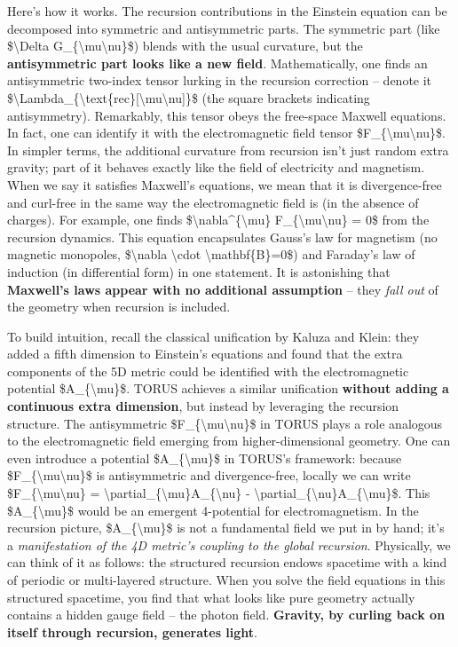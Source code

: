 Here's how it works. The recursion contributions in the Einstein
equation can be decomposed into symmetric and antisymmetric parts. The
symmetric part (like \$\textbackslash{}Delta
G\_\{\textbackslash{}mu\textbackslash{}nu\}\$) blends with the usual
curvature, but the \textbf{antisymmetric part looks like a new field}.
Mathematically, one finds an antisymmetric two-index tensor lurking in
the recursion correction -- denote it
\$\textbackslash{}Lambda\_\{\textbackslash{}text\{rec\}{[}\textbackslash{}mu\textbackslash{}nu{]}\}\$
(the square brackets indicating antisymmetry). Remarkably, this tensor
obeys the free-space Maxwell equations. In fact, one can identify it
with the electromagnetic field tensor
\$F\_\{\textbackslash{}mu\textbackslash{}nu\}\$​. In simpler terms, the
additional curvature from recursion isn't just random extra gravity;
part of it behaves exactly like the field of electricity and magnetism.
When we say it satisfies Maxwell's equations, we mean that it is
divergence-free and curl-free in the same way the electromagnetic field
is (in the absence of charges). For example, one finds
\$\textbackslash{}nabla\^{}\{\textbackslash{}mu\}
F\_\{\textbackslash{}mu\textbackslash{}nu\} = 0\$ from the recursion
dynamics​. This equation encapsulates Gauss's law for magnetism (no
magnetic monopoles, \$\textbackslash{}nabla \textbackslash{}cdot
\textbackslash{}mathbf\{B\}=0\$) and Faraday's law of induction (in
differential form) in one statement. It is astonishing that
\textbf{Maxwell's laws appear with no additional assumption} -- they
\emph{fall out} of the geometry when recursion is included.

To build intuition, recall the classical unification by Kaluza and
Klein: they added a fifth dimension to Einstein's equations and found
that the extra components of the 5D metric could be identified with the
electromagnetic potential \$A\_\{\textbackslash{}mu\}\$. TORUS achieves
a similar unification \textbf{without adding a continuous extra
dimension}, but instead by leveraging the recursion structure. The
antisymmetric \$F\_\{\textbackslash{}mu\textbackslash{}nu\}\$ in TORUS
plays a role analogous to the electromagnetic field emerging from
higher-dimensional geometry​. One can even introduce a potential
\$A\_\{\textbackslash{}mu\}\$ in TORUS's framework: because
\$F\_\{\textbackslash{}mu\textbackslash{}nu\}\$ is antisymmetric and
divergence-free, locally we can write
\$F\_\{\textbackslash{}mu\textbackslash{}nu\} =
\textbackslash{}partial\_\{\textbackslash{}mu\}A\_\{\textbackslash{}nu\}
-
\textbackslash{}partial\_\{\textbackslash{}nu\}A\_\{\textbackslash{}mu\}\$​.
This \$A\_\{\textbackslash{}mu\}\$ would be an emergent 4-potential for
electromagnetism. In the recursion picture,
\$A\_\{\textbackslash{}mu\}\$ is not a fundamental field we put in by
hand; it's a \emph{manifestation of the 4D metric's coupling to the
global recursion}. Physically, we can think of it as follows: the
structured recursion endows spacetime with a kind of periodic or
multi-layered structure. When you solve the field equations in this
structured spacetime, you find that what looks like pure geometry
actually contains a hidden gauge field -- the photon field.
\textbf{Gravity, by curling back on itself through recursion, generates
light}.

